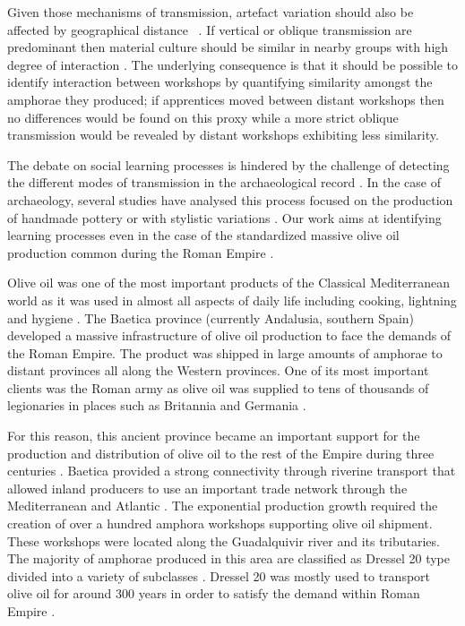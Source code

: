 \documentclass[review]{elsarticle}
\begin{document}
Given those mechanisms of transmission, artefact variation should also be affected by geographical distance ~\citep{bjorklund_effect_2010,shennan_isolation-by-distance_2015, van_strien_isolation-by-distance_2015}. If vertical or oblique transmission are predominant then material culture should be similar in nearby groups with high degree of interaction \citep{hart_effects_2012}. The underlying consequence is that it should be possible to identify interaction between workshops by quantifying similarity amongst the amphorae they produced; if apprentices moved between distant workshops then no differences would be found on this proxy while a more strict oblique transmission would be revealed by distant workshops exhibiting less similarity.

The debate on social learning processes is hindered by the challenge of detecting the different modes of transmission in the archaeological record \citep{roux_standardization_2015}. In the case of archaeology, several studies have analysed this process focused on the production of handmade pottery \citep{steele_james_ceramic_2010} or with stylistic variations \citep{neiman_stylistic_1995, shennan_ceramic_2001}.
Our work aims at identifying learning processes even in the case of the standardized massive olive oil production common during the Roman Empire \citep{bevan_mediterranean_2014}. 

Olive oil was one of the most important products of the Classical Mediterranean world as it was used in almost all aspects of daily life including cooking, lightning and hygiene \citep{mattingly_d.j._oil_1988}. The Baetica province (currently Andalusia, southern Spain) developed a massive infrastructure of olive oil production to face the demands of the Roman Empire. The product was shipped in large amounts of amphorae to distant provinces all along the Western provinces. One of its most important clients was the Roman army as olive oil was supplied to tens of thousands of legionaries in places such as Britannia \citep{monfort_britannia_1998,funari_economic_2005} and Germania \citep{remesal_annona_1986}. 

For this reason, this ancient province became an important support for the production and distribution of olive oil to the rest of the Empire during three centuries \citep{millet_anforas_1998, rodriguez_baetican_1998,chic2005comercio}. Baetica provided a strong connectivity through riverine transport that allowed inland producers to use an important trade network through the Mediterranean and Atlantic \citep{garcia_vargas_enrique_formal_2010}. The exponential production growth required the creation of over a hundred amphora workshops supporting olive oil shipment. These workshops were located along the Guadalquivir river and its tributaries. The majority of amphorae produced in this area are classified as Dressel 20 type divided into a variety of subclasses \citep{martin-kilcher_romischen_1994,berni_millet_epigrafianforica_2008}. Dressel 20 was mostly used to transport olive oil for around 300 years in order to satisfy the demand within Roman Empire \citep{rodriguez_economioleicola_1977}. 
\end{document}
